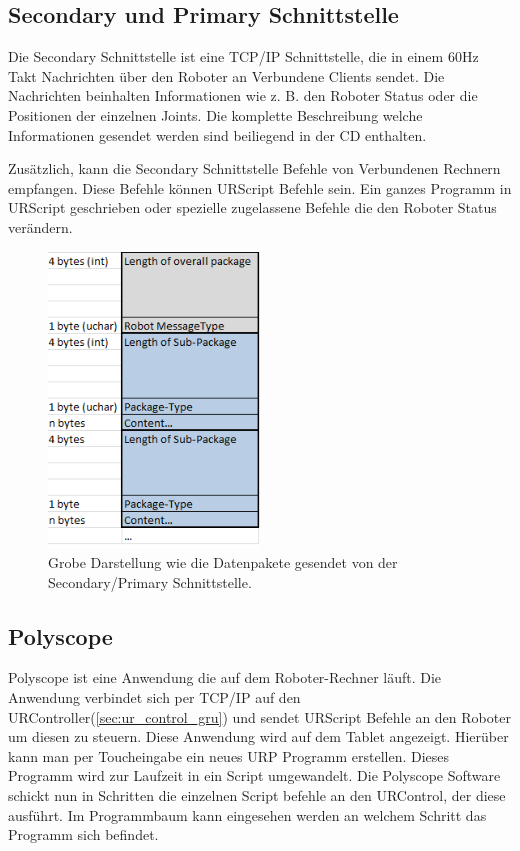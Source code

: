 \subsection{Secondary und Primary Schnittstelle}
\label{urcontrol_spi_gru}

Die Secondary Schnittstelle ist eine \acs{TCP/IP} Schnittstelle, die in einem 60Hz Takt Nachrichten über den Roboter an Verbundene Clients sendet.
Die Nachrichten beinhalten Informationen wie z. B. den Roboter Status oder die Positionen der einzelnen Joints.
Die komplette Beschreibung welche Informationen gesendet werden sind beiliegend in der CD enthalten.

Zusätzlich, kann die Secondary Schnittstelle Befehle von Verbundenen Rechnern empfangen.
Diese Befehle können URScript Befehle sein. Ein ganzes Programm in URScript geschrieben oder spezielle zugelassene Befehle die den Roboter Status verändern.

\begin{figure}[H]
  \centering
    \includegraphics[width=0.5\textwidth]{pic/secondary_datapackage_scheme.png}
      \caption[Schema des Datenpakets gesendet von der Secondary Schnittstelle]{Grobe Darstellung wie die Datenpakete gesendet von der Secondary/Primary Schnittstelle.}
      \label{fig:datascheme_of_secondary_interface}
\end{figure}

\subsection{Polyscope}
\label{urcontrol_polyscope_gru}

Polyscope ist eine Anwendung die auf dem Roboter-Rechner läuft. Die Anwendung verbindet sich per \acs{TCP/IP} auf den URController(\ref{sec:ur_control_gru}) und sendet URScript Befehle an den Roboter um diesen zu steuern.
Diese Anwendung wird auf dem Tablet angezeigt. Hierüber kann man per Toucheingabe ein neues \acs{URP} Programm erstellen. Dieses Programm wird zur Laufzeit in ein Script umgewandelt. Die Polyscope Software schickt nun in Schritten die einzelnen Script befehle an den URControl, der diese ausführt. Im Programmbaum kann eingesehen werden an welchem Schritt das Programm sich befindet.

